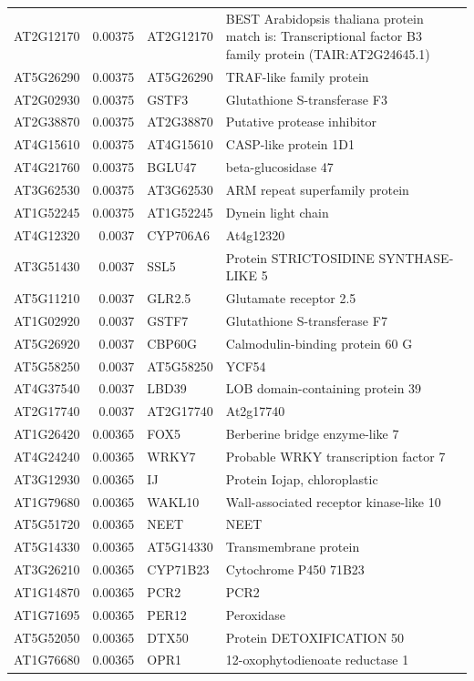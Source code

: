 \documentclass[11pt]{article}
\begin{document}
\begin{center}
\begin{tabular}{lrll}
AT2G12170 & 0.00375 & AT2G12170 & BEST Arabidopsis thaliana protein match is: Transcriptional factor B3 family protein (TAIR:AT2G24645.1)\\
AT5G26290 & 0.00375 & AT5G26290 & TRAF-like family protein\\
AT2G02930 & 0.00375 & GSTF3 & Glutathione S-transferase F3\\
AT2G38870 & 0.00375 & AT2G38870 & Putative protease inhibitor\\
AT4G15610 & 0.00375 & AT4G15610 & CASP-like protein 1D1\\
AT4G21760 & 0.00375 & BGLU47 & beta-glucosidase 47\\
AT3G62530 & 0.00375 & AT3G62530 & ARM repeat superfamily protein\\
AT1G52245 & 0.00375 & AT1G52245 & Dynein light chain\\
AT4G12320 & 0.0037 & CYP706A6 & At4g12320\\
AT3G51430 & 0.0037 & SSL5 & Protein STRICTOSIDINE SYNTHASE-LIKE 5\\
AT5G11210 & 0.0037 & GLR2.5 & Glutamate receptor 2.5\\
AT1G02920 & 0.0037 & GSTF7 & Glutathione S-transferase F7\\
AT5G26920 & 0.0037 & CBP60G & Calmodulin-binding protein 60 G\\
AT5G58250 & 0.0037 & AT5G58250 & YCF54\\
AT4G37540 & 0.0037 & LBD39 & LOB domain-containing protein 39\\
AT2G17740 & 0.0037 & AT2G17740 & At2g17740\\
AT1G26420 & 0.00365 & FOX5 & Berberine bridge enzyme-like 7\\
AT4G24240 & 0.00365 & WRKY7 & Probable WRKY transcription factor 7\\
AT3G12930 & 0.00365 & IJ & Protein Iojap, chloroplastic\\
AT1G79680 & 0.00365 & WAKL10 & Wall-associated receptor kinase-like 10\\
AT5G51720 & 0.00365 & NEET & NEET\\
AT5G14330 & 0.00365 & AT5G14330 & Transmembrane protein\\
AT3G26210 & 0.00365 & CYP71B23 & Cytochrome P450 71B23\\
AT1G14870 & 0.00365 & PCR2 & PCR2\\
AT1G71695 & 0.00365 & PER12 & Peroxidase\\
AT5G52050 & 0.00365 & DTX50 & Protein DETOXIFICATION 50\\
AT1G76680 & 0.00365 & OPR1 & 12-oxophytodienoate reductase 1\\

\end{tabular}
\end{center}
\end{document}
